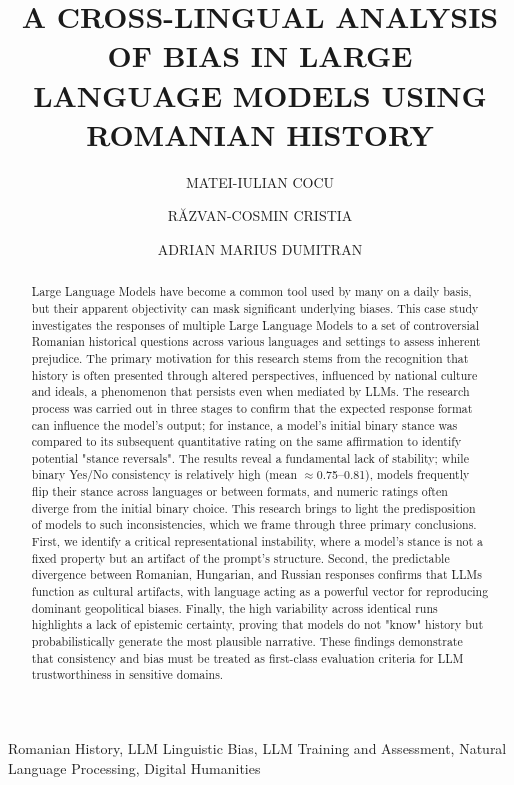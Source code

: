 \documentclass[11pt]{article}
\title{\textbf{\MakeUppercase{A Cross-Lingual Analysis of Bias in Large Language Models Using Romanian History}}}
\author[1]{\MakeUppercase{Matei-Iulian Cocu}}
\author[2]{\MakeUppercase{Răzvan-Cosmin Cristia}}
\author[3]{\MakeUppercase{Adrian Marius Dumitran}}
\affil[1]{University of Bucharest
\break
\texttt{cocu.matei24@yahoo.com}}
\affil[2]{University of Bucharest
\break
\texttt{cristiarazvan@gmail.com}}
\affil[3]{University of Bucharest, Softbinator
\break
\texttt{marius.dumitran@unibuc.ro}}
\date{}
\begin{document}
\maketitle
\thispagestyle{empty}
\begin{abstract}
Large Language Models have become a common tool used by many on a daily basis, but their apparent objectivity can mask significant underlying biases. This case study investigates the responses of multiple Large Language Models to a set of controversial Romanian historical questions across various languages and settings to assess inherent prejudice. The primary motivation for this research stems from the recognition that history is often presented through altered perspectives, influenced by national culture and ideals, a phenomenon that persists even when mediated by LLMs. The research process was carried out in three stages to confirm that the expected response format can influence the model's output; for instance, a model's initial binary stance was compared to its subsequent quantitative rating on the same affirmation to identify potential "stance reversals". The results reveal a fundamental lack of stability; while binary Yes/No consistency is relatively high (mean $\approx$0.75–0.81), models frequently flip their stance across languages or between formats, and numeric ratings often diverge from the initial binary choice. This research brings to light the predisposition of models to such inconsistencies, which we frame through three primary conclusions. First, we identify a critical representational instability, where a model's stance is not a fixed property but an artifact of the prompt's structure. Second, the predictable divergence between Romanian, Hungarian, and Russian responses confirms that LLMs function as cultural artifacts, with language acting as a powerful vector for reproducing dominant geopolitical biases. Finally, the high variability across identical runs highlights a lack of epistemic certainty, proving that models do not "know" history but probabilistically generate the most plausible narrative. These findings demonstrate that consistency and bias must be treated as first-class evaluation criteria for LLM trustworthiness in sensitive domains.
\end{abstract}

\begin{flushright}
\begin{keyword}
\break
Romanian History,
LLM Linguistic Bias,
LLM Training and Assessment,
Natural Language Processing,
Digital Humanities
\end{keyword}
\end{flushright}
\end{document}
